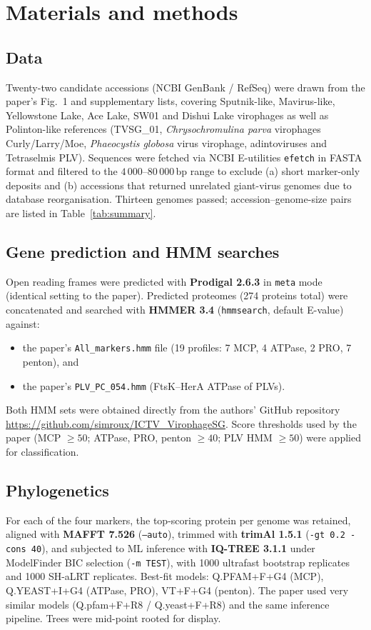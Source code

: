 \documentclass[11pt,a4paper]{article}
\begin{document}
\section{Materials and methods}

\subsection{Data}
\label{sec:data}
Twenty-two candidate accessions (NCBI GenBank / RefSeq) were drawn from the
paper's Fig.~1 and supplementary lists, covering Sputnik-like, Mavirus-like,
Yellowstone Lake, Ace Lake, SW01 and Dishui Lake virophages as well as
Polinton-like references (TVSG\_01, \emph{Chrysochromulina parva} virophages
Curly/Larry/Moe, \emph{Phaeocystis globosa} virus virophage, adintoviruses
and Tetraselmis PLV). Sequences were fetched via NCBI E-utilities
\texttt{efetch} in FASTA format and filtered to the
$4\,000$--$80\,000$\,bp range to exclude (a) short marker-only deposits and
(b) accessions that returned unrelated giant-virus genomes due to database
reorganisation. Thirteen genomes passed; accession--genome-size pairs are
listed in Table~\ref{tab:summary}.

\subsection{Gene prediction and HMM searches}
Open reading frames were predicted with \textbf{Prodigal 2.6.3} in
\texttt{meta} mode (identical setting to the paper). Predicted proteomes
(274 proteins total) were concatenated and searched with
\textbf{HMMER 3.4} (\texttt{hmmsearch}, default E-value) against:
\begin{itemize}[leftmargin=1.4em]
  \item the paper's \texttt{All\_markers.hmm} file (19 profiles: 7 MCP,
        4 ATPase, 2 PRO, 7 penton), and
  \item the paper's \texttt{PLV\_PC\_054.hmm} (FtsK--HerA ATPase of PLVs).
\end{itemize}
Both HMM sets were obtained directly from the authors' GitHub repository
\url{https://github.com/simroux/ICTV_VirophageSG}. Score thresholds used by
the paper (MCP $\geq 50$; ATPase, PRO, penton $\geq 40$; PLV HMM $\geq 50$)
were applied for classification.

\subsection{Phylogenetics}
For each of the four markers, the top-scoring protein per genome was
retained, aligned with \textbf{MAFFT 7.526} (\texttt{--auto}), trimmed with
\textbf{trimAl 1.5.1} (\texttt{-gt~0.2 -cons~40}), and subjected to
ML inference with \textbf{IQ-TREE 3.1.1} under ModelFinder BIC selection
(\texttt{-m TEST}), with 1000 ultrafast bootstrap replicates and 1000
SH-aLRT replicates. Best-fit models: Q.PFAM+F+G4 (MCP),
Q.YEAST+I+G4 (ATPase, PRO), VT+F+G4 (penton). The paper used very similar
models (Q.pfam+F+R8 / Q.yeast+F+R8) and the same inference pipeline.
Trees were mid-point rooted for display.
\end{document}

